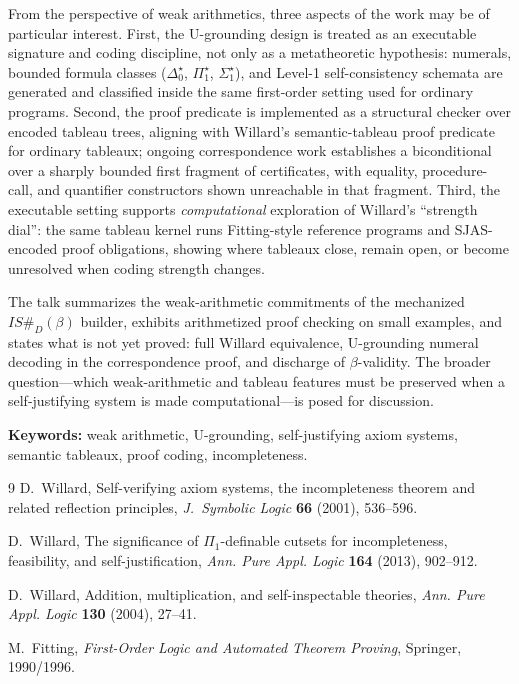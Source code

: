\documentclass[11pt]{article}
\begin{document}
\smallskip
\noindent
From the perspective of weak arithmetics, three aspects of the work may be
of particular interest.
First, the U-grounding design is treated as an executable signature and
coding discipline, not only as a metatheoretic hypothesis: numerals, bounded
formula classes ($\Delta^\star_0$, $\Pi^\star_1$, $\Sigma^\star_1$), and
Level-1 self-consistency schemata are generated and classified inside the
same first-order setting used for ordinary programs.
Second, the proof predicate is implemented as a structural checker over
encoded tableau trees, aligning with Willard's semantic-tableau proof
predicate for ordinary tableaux; ongoing correspondence work establishes a
biconditional over a sharply bounded first fragment of certificates, with
equality, procedure-call, and quantifier constructors shown unreachable in
that fragment.
Third, the executable setting supports \emph{computational} exploration of
Willard's ``strength dial'': the same tableau kernel runs Fitting-style
reference programs and SJAS-encoded proof obligations, showing where tableaux
close, remain open, or become unresolved when coding strength changes.

\smallskip
\noindent
The talk summarizes the weak-arithmetic commitments of the mechanized
$IS\#_D(\beta)$ builder, exhibits arithmetized proof checking on small
examples, and states what is not yet proved: full Willard equivalence,
U-grounding numeral decoding in the correspondence proof, and discharge of
$\beta$-validity.
The broader question---which weak-arithmetic and tableau features must be
preserved when a self-justifying system is made computational---is posed for
discussion.

\smallskip
\noindent
\textbf{Keywords:} weak arithmetic, U-grounding, self-justifying axiom
systems, semantic tableaux, proof coding, incompleteness.

\begin{thebibliography}{9}
D.~Willard,
Self-verifying axiom systems, the incompleteness theorem and related
reflection principles,
\emph{J.~Symbolic Logic} \textbf{66} (2001), 536--596.

D.~Willard,
The significance of $\Pi_1$-definable cutsets for incompleteness,
feasibility, and self-justification,
\emph{Ann. Pure Appl. Logic} \textbf{164} (2013), 902--912.

D.~Willard,
Addition, multiplication, and self-inspectable theories,
\emph{Ann. Pure Appl. Logic} \textbf{130} (2004), 27--41.

M.~Fitting,
\emph{First-Order Logic and Automated Theorem Proving},
Springer, 1990/1996.
\end{thebibliography}
\end{document}
